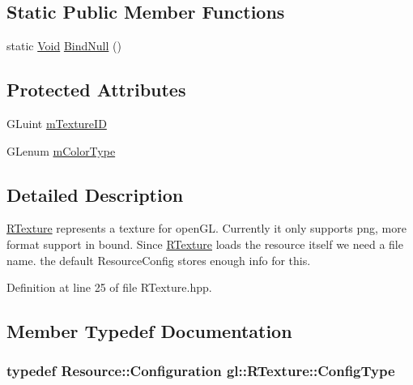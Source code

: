 \subsection*{Static Public Member Functions}
\begin{DoxyCompactItemize}
\item 
static \hyperlink{_basic_types_8hpp_afdf0f22c576e6ee1b982f64b839c4bea}{Void} \hyperlink{classgl_1_1_r_texture_ab6db1d3aaa5a91ad3cf1fb62348f2a7b}{Bind\-Null} ()
\end{DoxyCompactItemize}
\subsection*{Protected Attributes}
\begin{DoxyCompactItemize}
\item 
G\-Luint \hyperlink{classgl_1_1_r_texture_ac09f29aa4942ab525d65c98217be05ac}{m\-Texture\-I\-D}
\item 
G\-Lenum \hyperlink{classgl_1_1_r_texture_a0442b6e57cd493fa02b2167658785fe4}{m\-Color\-Type}
\end{DoxyCompactItemize}


\subsection{Detailed Description}
\hyperlink{classgl_1_1_r_texture}{R\-Texture} represents a texture for open\-G\-L. Currently it only supports png, more format support in bound. Since \hyperlink{classgl_1_1_r_texture}{R\-Texture} loads the resource itself we need a file name. the default Resource\-Config stores enough info for this. 

Definition at line 25 of file R\-Texture.\-hpp.



\subsection{Member Typedef Documentation}
\hypertarget{classgl_1_1_r_texture_af5e0de4fdd4b9bd003f8979a07324f0b}{
\subsubsection[{Config\-Type}]{\setlength{\rightskip}{0pt plus 5cm}typedef {\bf Resource\-::\-Configuration} {\bf gl\-::\-R\-Texture\-::\-Config\-Type}}}\label{classgl_1_1_r_texture_af5e0de4fdd4b9bd003f8979a07324f0b}



